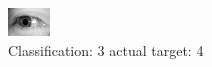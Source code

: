 \begin{figure}[h!]
\begin{center}
\includegraphics[width=0.60\columnwidth]{figures/ID3178_class_3_target_4.png}
\end{center}
\caption{ Classification: 3 actual target: 4}
\label{fig:ID3178_class_3_target_4}
\end{figure}
